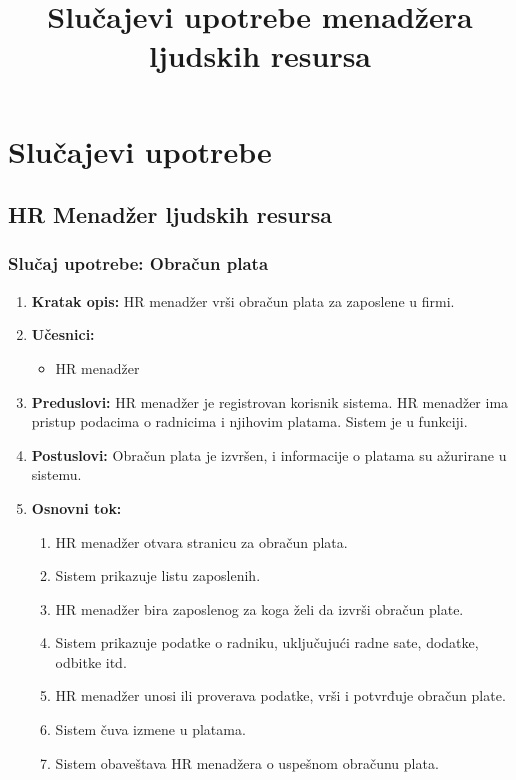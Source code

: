 \documentclass[a4paper]{article}
\title{Slučajevi upotrebe menadžera ljudskih resursa}
\begin{document}
\maketitle

\section{Slučajevi upotrebe}

\subsection{HR Menadžer ljudskih resursa}
\subsubsection{Slučaj upotrebe: Obračun plata}
\begin{enumerate}
    \item \textbf{Kratak opis:} HR menadžer vrši obračun plata za zaposlene u firmi.
    \item \textbf{Učesnici:}
        \begin{itemize}
            \item HR menadžer
        \end{itemize}
    \item \textbf{Preduslovi:} HR menadžer je registrovan korisnik sistema. HR menadžer ima pristup podacima o radnicima i njihovim platama. Sistem je u funkciji.
    \item \textbf{Postuslovi:} Obračun plata je izvršen, i informacije o platama su ažurirane u sistemu.
    \item \textbf{Osnovni tok:}
        \begin{enumerate}
            \item HR menadžer otvara stranicu za obračun plata.
            \item Sistem prikazuje listu zaposlenih.
            \item HR menadžer bira zaposlenog za koga želi da izvrši obračun plate.
            \item Sistem prikazuje podatke o radniku, uključujući radne sate, dodatke, odbitke itd.
            \item HR menadžer unosi ili proverava podatke, vrši i potvrđuje obračun plate.
            \item Sistem čuva izmene u platama.
            \item Sistem obaveštava HR menadžera o uspešnom obračunu plata.
        \end{enumerate}

\end{enumerate}
\end{document}
